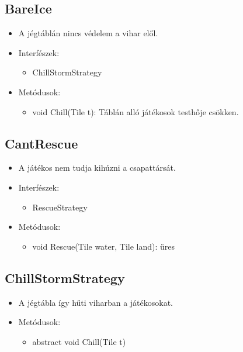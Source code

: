 \subsection{BareIce}
\begin{itemize}
\item A jégtáblán nincs védelem a vihar elől.

\item Interfészek:

	\begin{itemize}
		\item ChillStormStrategy
	\end{itemize}

\item Metódusok:
	\begin{itemize}
		\item void Chill(Tile t): Táblán alló játékosok testhője csökken.
	\end{itemize}
\end{itemize}

\subsection{CantRescue}
\begin{itemize}
	\item A játékos nem tudja kihúzni a csapattársát.
	
\item Interfészek:
\begin{itemize}
	\item RescueStrategy
\end{itemize}

\item Metódusok:
\begin{itemize}
	\item void Rescue(Tile water, Tile land): üres
\end{itemize}
\end{itemize}

\subsection{ChillStormStrategy}
\begin{itemize}
	\item A jégtábla így hűti viharban a játékosokat.

	\item Metódusok:
	\begin{itemize}
		\item abstract void Chill(Tile t)
	\end{itemize}
\end{itemize}

